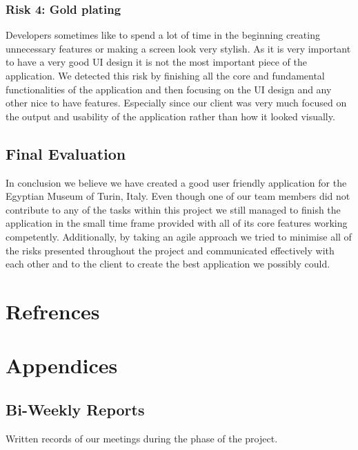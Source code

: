 \documentclass[12pt]{article}
\begin{document}
\subsubsection{Risk 4: Gold plating}
Developers sometimes like to spend a lot of time in the beginning creating unnecessary features or making a screen look very stylish. As it is very important to have a very good UI design it is not the most important piece of the application. We detected this risk by finishing all the core and fundamental functionalities of the application and then focusing on the UI design and any other nice to have features. Especially since our client was very much focused on the output and usability of the application rather than how it looked visually. 

\subsection{Final Evaluation}
In conclusion we believe we have created a good user friendly application for the Egyptian Museum of Turin, Italy. Even though one of our team members did not contribute to any of the tasks within this project we still managed to finish the application in the small time frame provided with all of its core features working competently. Additionally, by taking an agile approach we tried to minimise all of the risks presented throughout the project and communicated effectively with each other and to the client to create the best application we possibly could. 


\newpage
\section{Refrences}


\newpage
\section{Appendices}
\subsection{Bi-Weekly Reports}
Written records of our meetings during the phase of the project.
\end{document}
